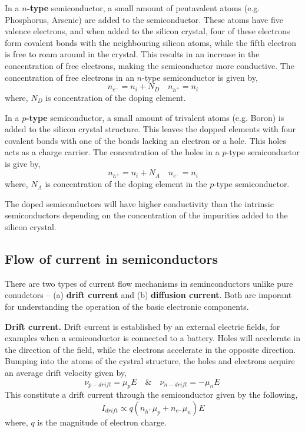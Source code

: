 In a \textbf{$n$-type} semiconductor, a small amount of pentavalent atoms (e.g. Phosphorus, Arsenic) are added to the semiconductor. These atoms have five valence electrons, and when added to the silicon crystal, four of these electrons form covalent bonds with the neighbouring silicon atoms, while the fifth electron is free to roam around in the crystal. This results in an increase in the concentration of free electrons, making the semiconductor more conductive. The concentration of free electrons in an $n$-type semiconductor is given by,
\begin{equation}
    n_{e^-} = n_i + N_D \quad n_{h^+} = n_i
    \label{eq:ch03-n-type-elec-conc}
\end{equation}
where, $N_D$ is concentration of the doping element.

In a \textbf{$p$-type} semiconductor, a small amount of trivalent atoms (e.g. Boron) is added to the silicon crystal structure. This leaves the dopped elements with four covalent bonds with one of the bonds lacking an electron or a hole. This holes acts as a charge carrier. The concentration of the holes in a $p$-type semiconductor is give by,
\begin{equation}
    n_{h^+} = n_i + N_A \quad n_{e^-} = n_i
    \label{eq:ch03-p-type-elec-conc}
\end{equation}
where, $N_A$ is concentration of the doping element in the $p$-type semiconductor.

The doped semiconductors will have higher conductivity than the intrinsic semiconductors depending on the concentration of the impurities added to the silicon crystal.

\subsection{Flow of current in semiconductors}
There are two types of current flow mechanisms in seminconductors unlike pure conudctors -- (a) \textbf{drift current} and (b) \textbf{diffusion current}. Both are imporant for understanding the operation of the basic electronic components.

\noindent\textbf{Drift current.} Drift current is established by an external electric fields, for examples when a semiconductor is connected to a battery. Holes will accelerate in the direction of the field, while the electrons accelerate in the opposite direction. Bumping into the atoms of the cystral structure, the holes and electrons acquire an average drift velocity given by,
\begin{equation}
    \nu_{p-drift} = \mu_p E \quad \& \quad \nu_{n-drift} = -\mu_n E\
    \label{eq:ch03-drift-vel}
\end{equation}
This constitute a drift current through the semiconductor given by the following,
\begin{equation}
    I_{drift} \propto q\left(n_{h^+}\mu_p + n_{e^-}\mu_n \right) E
    \label{eq:ch03-drift-current}
\end{equation}
where, $q$ is the magnitude of electron charge.

